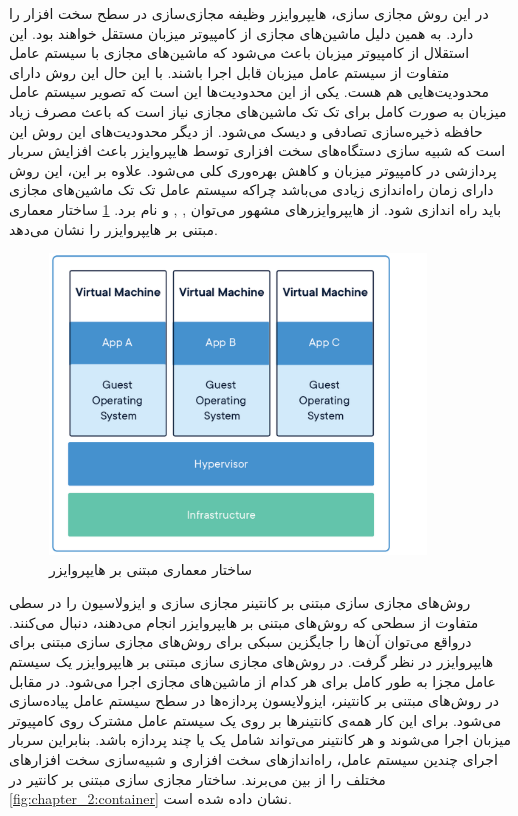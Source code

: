     در این روش مجازی سازی، {هایپروایزر} وظیفه مجازی‌سازی در سطح سخت افزار را دارد.
    به همین دلیل ماشین‌های مجازی از کامپیوتر میزبان مستقل خواهند بود.
    این استقلال از کامپیوتر میزبان باعث می‌شود که ماشین‌های مجازی با سیستم عامل متفاوت از سیستم عامل میزبان قابل اجرا باشند\cite{morabito2015hypervisors}.
    با این حال این روش دارای محدودیت‌هایی هم هست.
    یکی از این محدودیت‌ها این است که تصویر سیستم عامل میزبان به صورت کامل برای تک تک ماشین‌های مجازی نیاز است که باعث مصرف زیاد حافظه ذخیره‌سازی تصادفی و دیسک می‌شود.
    از دیگر محدودیت‌های این روش این است که شبیه سازی دستگاه‌های سخت افزاری توسط {هایپروایزر}  باعث افزایش سربار پردازشی در کامپیوتر میزبان و کاهش بهره‌وری کلی می‌شود.
    علاوه بر این، این روش دارای زمان راه‌اندازی زیادی می‌باشد چراکه سیستم عامل تک تک ماشین‌های مجازی باید راه اندازی شود.
    از {هایپروایزر}های مشهور می‌توان \cite{2019kvm}, \cite{2019esxi}, \cite{2019xen} و \cite{2019hyper} نام برد.
    \cref{fig:chapter_2:vm} ساختار معماری مبتنی بر {هایپروایزر} را نشان می‌دهد.

    \begin{figure}[]
      \centerline{\includegraphics[width=10cm]{graphics/chapter_2/vm}}
      \caption{ساختار معماری مبتنی بر {هایپروایزر} \cite{2018are}}
      \label{fig:chapter_2:vm}
    \end{figure}

    روش‌های مجازی سازی مبتنی بر کانتینر مجازی سازی و ایزولاسیون را در سطی متفاوت از سطحی که روش‌های مبتنی بر {هایپروایزر} انجام می‌دهند، دنبال می‌کنند.
    درواقع می‌توان آن‌ها را جایگزین سبکی برای روش‌های مجازی سازی مبتنی برای {هایپروایزر} در نظر گرفت.
    در روش‌های مجازی سازی مبتنی بر {هایپروایزر} یک سیستم عامل مجزا به طور کامل برای هر کدام از ماشین‌های مجازی اجرا می‌شود.
    در مقابل در روش‌های مبتنی بر کانتینر، ایزولایسون پردازه‌ها در سطح سیستم عامل پیاده‌سازی می‌شود.
    برای این کار همه‌ی کانتینر‌ها بر روی یک سیستم عامل مشترک روی کامپیوتر میزبان اجرا می‌شوند و هر کانتینر می‌تواند شامل یک یا چند پردازه باشد.
    بنابراین سربار اجرای چندین سیستم عامل، راه‌انداز‌های سخت افزاری و شبیه‌سازی سخت افزار‌های مختلف را از بین می‌برند.
    ساختار مجازی سازی مبتنی بر کانتیر در \cref{fig:chapter_2:container} نشان داده شده است.

